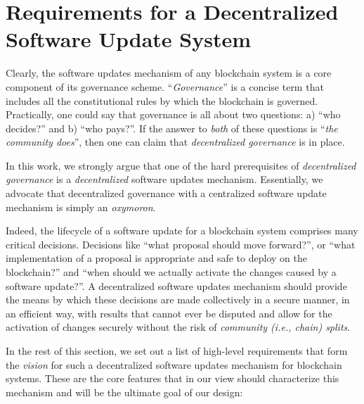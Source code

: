 \section{Requirements for a Decentralized Software Update 
System}\label{sec:requirements}

Clearly, the software updates mechanism of any blockchain system is a core 
component of its governance scheme. ``\emph{Governance}'' is a concise term 
that includes all the constitutional rules by which the blockchain is governed. 
Practically, one could say that governance is all about two questions: a)  ``who
decides?'' and b) ``who pays?''. If the answer to \emph{both} of these 
questions is  
``\emph{the community does}'', then one can claim that \emph{decentralized 
governance} is in place.

In this work, we strongly argue that one of the hard prerequisites of 
\emph{decentralized governance} is a \emph{decentralized} software updates 
mechanism. Essentially, we advocate that decentralized governance with a 
centralized software update mechanism is simply an \emph{oxymoron}.

Indeed, the lifecycle of a software update for a blockchain system comprises 
many critical decisions. Decisions like ``what proposal should move 
forward?'', or ``what implementation of a proposal is appropriate and safe to 
deploy on the blockchain?''  and ``when should we actually activate the changes 
caused by a software update?''. A decentralized software updates mechanism 
should provide the means by which these decisions are made collectively in a 
secure manner, in an efficient way, with results that cannot ever be 
disputed and allow for the activation of changes securely without the risk of 
\emph{community (i.e., chain) splits}.

In the rest of this section, we set out a list of high-level requirements that 
form the \emph{vision} for such a decentralized software updates 
mechanism for blockchain systems. These are the core features that in our view 
should characterize this mechanism and will be the ultimate goal of our design:

